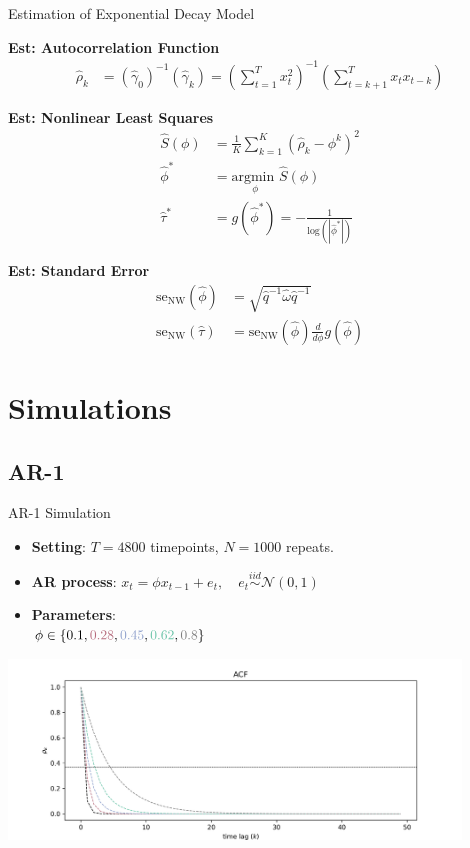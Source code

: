 \documentclass[12pt]{beamer}
\begin{document}
\begin{frame}{Estimation of Exponential Decay Model}
\footnotesize

\textbf{Est: Autocorrelation Function}
\begin{align}
    \hat\rho_k &= (\hat\gamma_0)^{-1}(\hat\gamma_k) = (\sum_{t=1}^T x_t^2)^{-1} (\sum_{t=k+1}^{T}x_t x_{t-k})
\end{align}

\textbf{Est: Nonlinear Least Squares}
\begin{align}
    \hat S(\phi) &= \frac{1}{K} \sum_{k=1}^K (\hat\rho_k - \phi^k)^2\\
    \hat\phi^* &= \underset{\phi}{\text{argmin }} \hat S(\phi)\\
    \hat\tau^* &= g(\hat\phi^*) = -\frac{1}{\text{log}(|\hat\phi^*|)}
\end{align}

\textbf{Est: Standard Error}
\begin{align}
    \text{se}_\text{NW}(\hat\phi) &= \sqrt{\hat q^{-1}\hat\omega\hat q^{-1}}\\
    \text{se}_\text{NW}(\hat\tau) &= \text{se}_\text{NW}(\hat\phi) \frac{d}{d\phi} g(\hat\phi)
\end{align}
\end{frame}


\section{Simulations}

\subsection{AR-1}
\begin{frame}{AR-1 Simulation}
\footnotesize
\begin{itemize}
    \item \textbf{Setting}: $T = 4800$ timepoints, $N = 1000$ repeats.
    \item \textbf{AR process}: $x_t = {\phi} x_{t-1} + e_t, \quad e_t \overset{iid}{\sim} \mathcal{N}(0, 1)$
    \item \textbf{Parameters}:\\
    $\phi \in \{\textcolor[HTML]{000000}{0.1}, \textcolor[HTML]{B66B7C}{0.28}, \textcolor[HTML]{8D9FCB}{0.45}, \textcolor[HTML]{66C2A6}{0.62}, \textcolor[HTML]{7D7D7D}{0.8}\}$\\
\end{itemize}

\centering
\includegraphics[width=0.9\textwidth]{latex/slides/simulations-ar1.png}
\end{frame}
\end{document}
